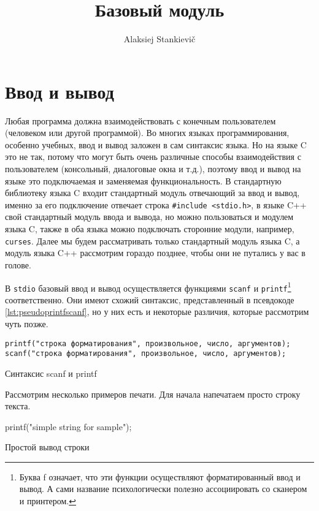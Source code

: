 \documentclass[12pt]{article}
\author{Alaksiej Stankievič}
\title{Базовый модуль}
\begin{document}

\section{Ввод и вывод}
Любая программа должна взаимодействовать с конечным пользователем (человеком или другой программой). Во многих языках программирования, особенно учебных, ввод и вывод заложен в сам синтаксис языка. Но на языке C это не так, потому что могут быть очень различные способы взаимодействия с пользователем (консольный, диалоговые окна и т.д.), поэтому ввод и вывод на языке это подключаемая и заменяемая функциональность. В стандартную библиотеку языка C входит стандартный модуль отвечающий за ввод и вывод, именно за его подключение отвечает строка \verb|#include <stdio.h>|, в языке C++ свой стандартный модуль ввода и вывода, но можно пользоваться и модулем языка C, также в оба языка можно подключать сторонние модули, например, \verb|curses|. Далее мы будем рассматривать только стандартный модуль языка C, а модуль языка C++ рассмотрим гораздо позднее, чтобы они не путались у вас в голове.

В \verb|stdio| базовый ввод и вывод осуществляется функциями \verb|scanf| и \verb|printf|\footnote{Буква f означает, что эти функции осуществляют форматированный ввод и вывод. А сами название психологически полезно ассоциировать со сканером и принтером.} соответственно. Они имеют схожий синтаксис, представленный в псевдокоде \ref{lst:pseudoprintfscanf}, но у них есть и некоторые различия, которые рассмотрим чуть позже.

\begin{listing}[ht]
\begin{center}
\begin{verbatim}
printf("строка форматирования", произвольное, число, аргументов);
scanf("строка форматирования", произвольное, число, аргументов);
\end{verbatim}
\end{center}
\caption{Синтаксис scanf и printf}
\label{lst:pseudoprintfscanf}
\end{listing}


Рассмотрим несколько примеров печати. Для начала напечатаем просто строку текста.

\begin{listing}[ht]
\begin{ccode}
printf("simple string for sample");
\end{ccode}
\caption{Простой вывод строки}
\label{lst:simplestring}
\end{listing}
\end{document}
